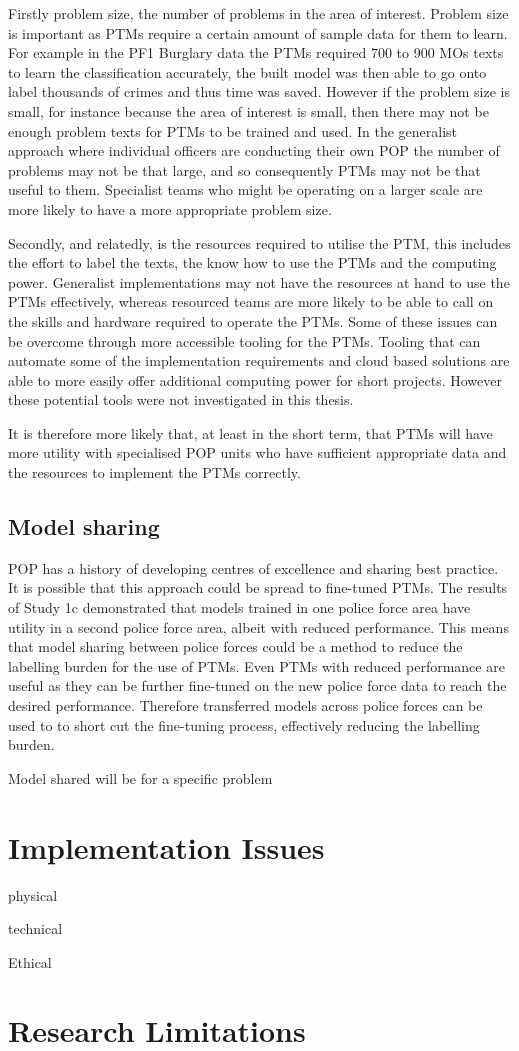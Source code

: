 Firstly problem size, the number of problems in the area of interest. Problem size is important as PTMs require a certain amount of sample data for them to learn. For example in the PF1 Burglary data the PTMs required 700 to 900 MOs texts to learn the classification accurately, the built model was then able to go onto label thousands of crimes and thus time was saved. However if the problem size is small, for instance because the area of interest is small, then there may not be enough problem texts for PTMs to be trained and used.  In the generalist approach where individual officers are conducting their own POP the number of  problems may not be that large, and so consequently PTMs may not be that useful to them. Specialist teams who might be operating on a larger scale are more likely to have a more appropriate problem size.  

Secondly, and relatedly, is the resources required to utilise the PTM, this includes the effort to label the texts, the know how to use the PTMs and the computing power. Generalist implementations may not have the resources at hand to use the PTMs effectively, whereas resourced teams are more likely to be able to call on the skills and hardware required to operate the PTMs. Some of these issues can be overcome through more accessible tooling for the PTMs. Tooling that can automate some of the implementation requirements and cloud based solutions are able to more easily offer additional computing power for short projects. However these potential tools were not investigated in this thesis.

It is therefore more likely that, at least in the short term, that PTMs will have more utility with specialised POP units who have sufficient appropriate data and the resources to implement the PTMs correctly.

\subsection{Model sharing} POP has a history of developing centres of excellence and sharing best practice. It is possible that this approach could be spread to fine-tuned PTMs. The results of Study 1c demonstrated that models trained in one police force area have utility in a second police force area, albeit with reduced performance. This means that model sharing between police forces could be a method to reduce the labelling burden for the use of PTMs. Even PTMs with reduced performance are useful as they can be further fine-tuned on the new police force data to reach the desired performance.  Therefore transferred models across police forces can be used to to short cut the fine-tuning process, effectively reducing the labelling burden. 

Model shared will be for a specific problem 

\section{Implementation Issues}

physical

technical

Ethical


\section{Research Limitations}
